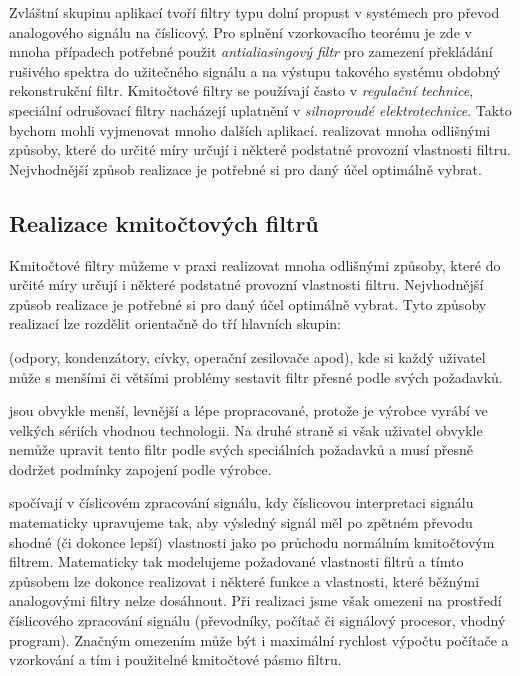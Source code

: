       Zvláštní skupinu aplikací tvoří filtry typu dolní propust v systémech pro převod analogového
      signálu na číslicový. Pro splnění vzorkovacího teorému je zde v mnoha případech potřebné
      použit \emph{antialiasingový filtr} pro zamezení překládání rušivého spektra do užitečného
      signálu a na výstupu takového systému obdobný rekonstrukční filtr. Kmitočtové filtry se
      používají často v \emph{regulační technice}, speciální odrušovací filtry nacházejí uplatnění
      v \emph{silnoproudé elektrotechnice}. Takto bychom mohli vyjmenovat mnoho dalších aplikací.
      realizovat mnoha odlišnými způsoby, které do určité míry určují i některé podstatné provozní
      vlastnosti filtru. Nejvhodnější způsob realizace je potřebné si pro daný účel optimálně
      vybrat. 
    
    \subsection{Realizace kmitočtových filtrů}
      Kmitočtové filtry můžeme v praxi realizovat mnoha odlišnými způsoby, které do určité míry
      určují i některé podstatné provozní vlastnosti filtru. Nejvhodnější způsob realizace je
      potřebné si pro daný účel optimálně vybrat. Tyto způsoby realizací lze rozdělit orientačně
      do tří hlavních skupin:
      \begin{description}[noitemsep]
        \item[\textbf{diskrétní prvky}] (odpory, kondenzátory, cívky, operační zesilovače apod), kde
              si každý uživatel může s menšími či většími problémy sestavit filtr přesné podle svých
              požadavků.
        \item[\textbf{integrované bloky}] jsou obvykle menší, levnější a lépe propracované, protože 
              je výrobce vyrábí ve velkých sériích vhodnou technologii. Na druhé straně si však 
              uživatel obvykle nemůže upravit tento filtr podle svých speciálních požadavků a musí 
              přesně dodržet podmínky zapojení podle výrobce.
        \item[\textbf{číslicové filtry}] spočívají v číslicovém zpracování signálu, kdy číslicovou
              interpretaci signálu matematicky upravujeme tak, aby výsledný signál měl po zpětném
              převodu shodné (či dokonce lepší) vlastnosti jako po průchodu normálním kmitočtovým
              filtrem. Matematicky tak modelujeme požadované vlastnosti filtrů a tímto způsobem lze
              dokonce realizovat i některé funkce a vlastnosti, které běžnými analogovými filtry
              nelze dosáhnout. Při realizaci jsme však omezeni na prostředí číslicového zpracování
              signálu (převodníky, počítač či signálový procesor, vhodný program). Značným omezením
              může být i maximální rychlost výpočtu počítače a vzorkování a tím i použitelné
              kmitočtové pásmo filtru.         
      \end{description}

